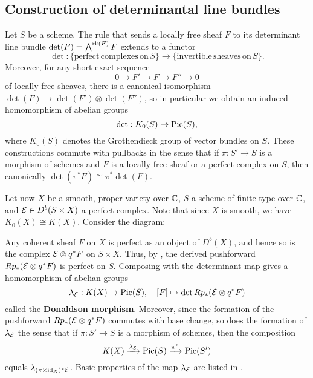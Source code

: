 \subsection{Construction of determinantal line bundles}
Let $S$ be a scheme. The rule that sends a locally free sheaf $F$ to its determinant line bundle $\det(F) = \bigwedge^{\operatorname{\mathrm{rk}}(F)} F$ extends to a functor
\[ \det: \{\mathrm{perfect\, complexes\, on\,} S\} \to \{\mathrm{invertible\,} \mathrm{sheaves\, on}\, S \}. \]
Moreover, for any short exact sequence
\[ 0 \to F' \to F \to F'' \to 0 \]
of locally free sheaves, there is a canonical isomorphism $\det(F) \to \det(F') \otimes \det(F'')$, so in particular we obtain an induced homomorphism of abelian groups
\[ \det: K_0(S) \to \mathrm{Pic}(S), \]
where $K_0(S)$ denotes the Grothendieck group of vector bundles on $S$. These constructions commute with pullbacks in the sense that if $\pi: S' \to S$ is a morphism of schemes and $F$ is a locally free sheaf or a perfect complex on $S$, then canonically $\det(\pi^* F) \cong \pi^*\det(F)$.

Let now $X$ be a smooth, proper variety over $\mathbb{C}$, $S$ a scheme of finite type over $\mathbb{C}$, and $\mathcal{E} \in D^b(S \times X)$ a perfect complex. Note that since $X$ is smooth, we have $K_0(X) \cong K(X)$. Consider the diagram:
\begin{center}
\end{center}
Any coherent sheaf $F$ on $X$ is perfect as an object of $D^b(X)$, and hence so is the complex $\mathcal{E} \otimes q^*F$ on $S \times X$. Thus, by \cite[\href{https://stacks.math.columbia.edu/tag/0B91}{Tag 0B91}]{stacks-project}, the derived pushforward $R p_* (\mathcal{E} \otimes q^* F)$ is perfect on $S$. Composing with the determinant map gives a homomorphism of abelian groups
\[ \lambda_{\mathcal{E}}: K(X) \to \mathrm{Pic}(S), \quad [F] \mapsto \det R p_*(\mathcal{E} \otimes q^* F) \]
called the {\bf Donaldson morphism}. Moreover, since the formation of the pushforward $R p_*(\mathcal{E} \otimes q^* F)$ commutes with base change, so does the formation of $\lambda_{\mathcal{E}}$ the sense that if $\pi: S' \to S$ is a morphism of schemes, then the composition
\[ K(X) \xrightarrow{\lambda_{\mathcal{E}}} \mathrm{Pic}(S) \xrightarrow{\pi^*} \mathrm{Pic}(S') \]
equals $\lambda_{(\pi \times \mathrm{id}_X)^* \mathcal{E}}$. Basic properties of the map $\lambda_{\mathcal{E}}$ are listed in \cite[Lemma 8.1.2]{HL}.

